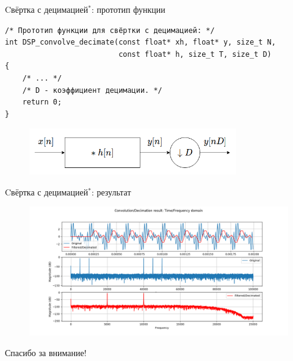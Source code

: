 \documentclass{beamer}
\begin{document}
    \begin{frame}[fragile]{Cвёртка с децимацией$^{*}$: прототип функции}
        \begin{verbatim}
/* Прототип функции для свёртки с децимацией: */
int DSP_convolve_decimate(const float* xh, float* y, size_t N, 
                          const float* h, size_t T, size_t D)
{
    /* ... */
    /* D - коэффициент децимации. */
    return 0;
}
        \end{verbatim}
        \begin{figure}[!tbp]
           \centering
           \includegraphics[width=0.8\textwidth]{pics/convdec.png}
           \captionsetup{justification=centering}
        \end{figure}
    \end{frame}
    \begin{frame}[fragile]{Cвёртка с децимацией$^{*}$: результат}
        \begin{figure}[!tbp]
           \centering
           \includegraphics[width=\textwidth]{pics/result_decimated.png}
           \captionsetup{justification=centering}
        \end{figure}
    \end{frame}
    \begin{frame}
        \begin{center}
        \baselineskip 20.0mm
        \Huge Спасибо за внимание!
        \end{center}
    \end{frame}
\end{document}
